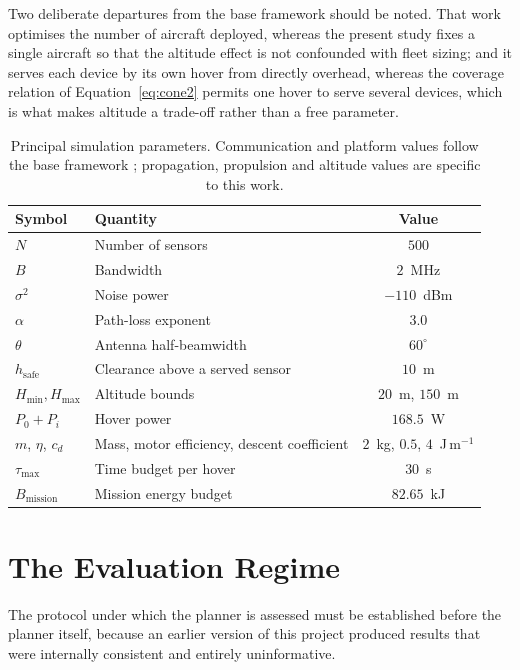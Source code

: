 Two deliberate departures from the base framework should be noted. That work optimises the number of aircraft deployed, whereas the present study fixes a single aircraft so that the altitude effect is not confounded with fleet sizing; and it serves each device by its own hover from directly overhead, whereas the coverage relation of Equation~\eqref{eq:cone2} permits one hover to serve several devices, which is what makes altitude a trade-off rather than a free parameter.

\begin{table}[!ht]
\centering
\caption[Principal simulation parameters]{Principal simulation parameters. Communication and platform values follow the base framework \cite{paperA}; propagation, propulsion and altitude values are specific to this work.}
\label{tab:params}
\begin{tabular}{llc}
\toprule
\textbf{Symbol} & \textbf{Quantity} & \textbf{Value} \\
\midrule
$N$ & Number of sensors & $500$ \\
$B$ & Bandwidth & $2$~MHz \\
$\sigma^2$ & Noise power & $-110$~dBm \\
$\alpha$ & Path-loss exponent & $3.0$ \\
$\theta$ & Antenna half-beamwidth & $60^{\circ}$ \\
$h_{\mathrm{safe}}$ & Clearance above a served sensor & $10$~m \\
$H_{\min}, H_{\max}$ & Altitude bounds & $20$~m, $150$~m \\
$P_0 + P_i$ & Hover power & $168.5$~W \\
$m$, $\eta$, $c_d$ & Mass, motor efficiency, descent coefficient & $2$~kg, $0.5$, $4$~J\,m$^{-1}$ \\
$\tau_{\max}$ & Time budget per hover & $30$~s \\
$B_{\mathrm{mission}}$ & Mission energy budget & $82.65$~kJ \\
\bottomrule
\end{tabular}
\end{table}

\section{The Evaluation Regime}
\label{sec:regime}

The protocol under which the planner is assessed must be established before the planner itself, because an earlier version of this project produced results that were internally consistent and entirely uninformative.

